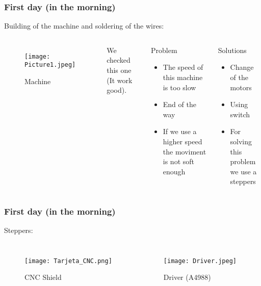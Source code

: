 \documentclass{beamer}
\begin{document}
\begin{frame}
\frametitle{First day (in the morning)}
Building of the machine and soldering of the wires:

\begin{columns}

\begin{figure}[hbtp]
\centering
\texttt{[image: Picture1.jpeg]}
\caption{Machine}
\end{figure}


We checked this one (It work good).

\begin{alertblock}{Problem}
\begin{itemize}
\item{}The speed of this machine is too slow
\item{}End of the way
\item{}If we use a higher speed the moviment is not soft enough
\end{itemize}

\end{alertblock}

\begin{block}{Solutions}
\begin{itemize}
\item{}Change of the motors
\item{}Using switch
\item{}For solving this problem we use a steppers
\end{itemize}
\end{block}


\end{columns}
\end{frame}





\begin{frame}
\frametitle{First day (in the morning)}
Steppers:
\begin{columns}

\begin{figure}[hbtp]
\centering
\texttt{[image: Tarjeta\_CNC.png]}
\caption{CNC Shield}
\end{figure}


\begin{figure}[hbtp]
\centering
\texttt{[image: Driver.jpeg]}
\caption{Driver (A4988)}
\end{figure}

\end{columns}
\end{frame}
\end{document}
